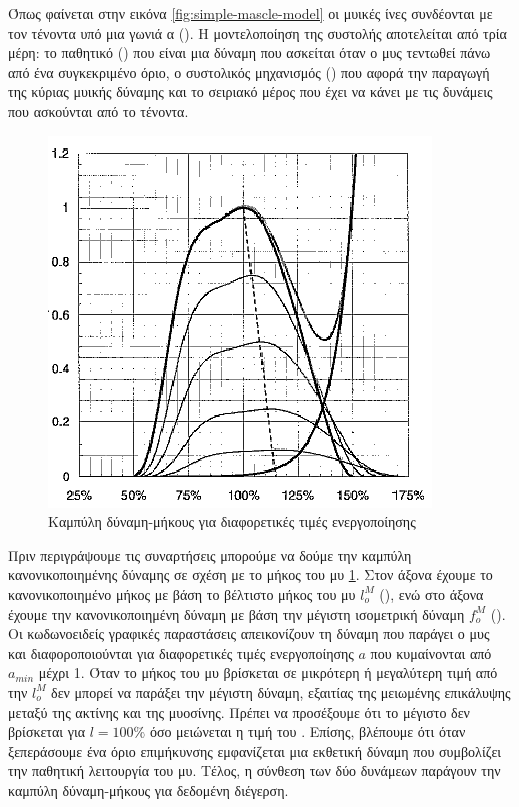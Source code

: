 Όπως φαίνεται στην εικόνα \ref{fig:simple-mascle-model} οι μυικές ίνες συνδέονται με τον τένοντα υπό μια γωνιά α (). Η μοντελοποίηση της συστολής αποτελείται από τρία μέρη: το παθητικό () που είναι μια δύναμη που ασκείται όταν ο μυς τεντωθεί πάνω από ένα συγκεκριμένο όριο, ο συστολικός μηχανισμός () που αφορά την παραγωγή της κύριας μυικής δύναμης και το σειριακό μέρος που έχει να κάνει με τις δυνάμεις που ασκούνται από το τένοντα.

\begin{figure}[H]
    \centering
    \includegraphics[width=.5\textwidth, height=.35\textheight, keepaspectratio]{fig/active-force-legnth.png}
    \caption{Καμπύλη δύναμη-μήκους για διαφορετικές τιμές ενεργοποίησης \cite{buchanan04}}
    \label{fig:active-force-legnth}
\end{figure}

Πριν περιγράψουμε τις συναρτήσεις μπορούμε να δούμε την καμπύλη κανονικοποιημένης δύναμης σε σχέση με το μήκος του μυ \ref{fig:active-force-legnth}. Στον άξονα  έχουμε το κανονικοποιημένο μήκος με βάση το βέλτιστο μήκος του μυ $l^{M}_{o}$ (), ενώ στο άξονα  έχουμε την κανονικοποιημένη δύναμη με βάση την μέγιστη ισομετρική δύναμη $f^{M}_{o}$ (). Οι κωδωνοειδείς γραφικές παραστάσεις απεικονίζουν τη δύναμη που παράγει ο μυς και διαφοροποιούνται για διαφορετικές τιμές ενεργοποίησης $a$ που κυμαίνονται από $a_{min}$ μέχρι 1. Όταν το μήκος του μυ βρίσκεται σε μικρότερη ή μεγαλύτερη τιμή από την $l^{M}_{o}$ δεν μπορεί να παράξει την μέγιστη δύναμη, εξαιτίας της μειωμένης επικάλυψης μεταξύ της ακτίνης και της μυοσίνης. Πρέπει να προσέξουμε ότι το μέγιστο δεν βρίσκεται για $l = 100\%$ όσο μειώνεται η τιμή του . Επίσης, βλέπουμε ότι όταν ξεπεράσουμε ένα όριο επιμήκυνσης εμφανίζεται μια εκθετική δύναμη που συμβολίζει την παθητική λειτουργία του μυ. Τέλος, η σύνθεση των δύο δυνάμεων παράγουν την καμπύλη δύναμη-μήκους για δεδομένη διέγερση.

